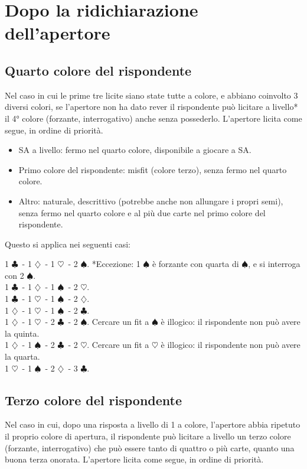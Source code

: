 \documentclass[a4paper,10pt]{article}
\renewcommand{\c}{$\clubsuit$\xspace}
\renewcommand{\d}{$\diamondsuit$\xspace}
\newcommand{\h}{$\heartsuit$\xspace}
\newcommand{\s}{$\spadesuit$\xspace}
\newcommand{\sa}{SA\xspace}
\begin{document}
\pagebreak

\section{Dopo la ridichiarazione dell'apertore}

\subsection{Quarto colore del rispondente}

Nel caso in cui le prime tre licite siano state tutte a colore, e abbiano coinvolto 3 diversi colori, se l'apertore non ha dato rever il rispondente può licitare a livello* il 4° colore (forzante, interrogativo) anche senza possederlo. L'apertore licita come segue, in ordine di priorità.

\begin{itemize}
 \item \sa a livello: fermo nel quarto colore, disponibile a giocare a \sa.
 \item Primo colore del rispondente: misfit (colore terzo), senza fermo nel quarto colore.
 \item Altro: naturale, descrittivo (potrebbe anche non allungare i propri semi), senza fermo nel quarto colore e al più due carte nel primo colore del rispondente.
\end{itemize}

Questo si applica nei seguenti casi:

1 \c\ - 1 \d\ - 1 \h\ - 2 \s. *Eccezione: 1 \s è forzante con quarta di \s, e si interroga con 2 \s.\\
1 \c\ - 1 \d\ - 1 \s\ - 2 \h.\\
1 \c\ - 1 \h\ - 1 \s\ - 2 \d.\\
1 \d\ - 1 \h\ - 1 \s\ - 2 \c.\\
1 \d\ - 1 \h\ - 2 \c\ - 2 \s. Cercare un fit a \s è illogico: il rispondente non può avere la quinta.\\
1 \d\ - 1 \s\ - 2 \c\ - 2 \h. Cercare un fit a \h è illogico: il rispondente non può avere la quarta.\\
1 \h\ - 1 \s\ - 2 \d\ - 3 \c.

\subsection{Terzo colore del rispondente}

Nel caso in cui, dopo una risposta a livello di 1 a colore, l'apertore abbia ripetuto il proprio colore di apertura, il rispondente può licitare a livello un terzo colore (forzante, interrogativo) che può essere tanto di quattro o più carte, quanto una buona terza onorata. L'apertore licita come segue, in ordine di priorità.
\end{document}
